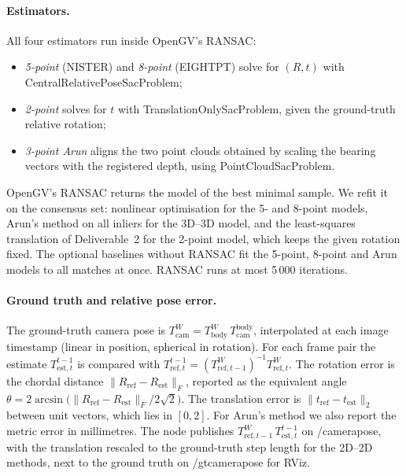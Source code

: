 \documentclass[11pt,a4paper]{article}
\DeclareRobustCommand{\code}[1]{\begingroup\ttfamily\codebreaks#1\endgroup}
\newcommand{\codebreaks}{\renewcommand{\_}{\textunderscore\allowbreak}}
\begin{document}
\paragraph{Estimators.}
All four estimators run inside OpenGV's RANSAC:
\begin{itemize}
  \item \emph{5-point} (\code{NISTER}) and \emph{8-point} (\code{EIGHTPT}) solve
    for $(R, t)$ with\\ \code{CentralRelativePoseSacProblem};
  \item \emph{2-point} solves for $t$ with \code{TranslationOnlySacProblem}, given
    the ground-truth relative rotation;
  \item \emph{3-point Arun} aligns the two point clouds obtained by scaling the
    bearing vectors with the registered depth, using \code{PointCloudSacProblem}.
\end{itemize}
OpenGV's RANSAC returns the model of the best minimal sample. We refit it on the
consensus set: nonlinear optimisation for the 5- and 8-point models, Arun's method on
all inliers for the 3D--3D model, and the least-squares translation of
Deliverable~2 for the 2-point model, which keeps the given rotation fixed. The optional
baselines without RANSAC fit the 5-point, 8-point and Arun models to all matches at
once. RANSAC runs at most 5\,000 iterations.

\paragraph{Ground truth and relative pose error.}
The ground-truth camera pose is $T^W_{\mathrm{cam}} = T^W_{\mathrm{body}}\,
T^{\mathrm{body}}_{\mathrm{cam}}$, interpolated at each image timestamp (linear in
position, spherical in rotation). For each frame pair the estimate
$T^{t-1}_{\mathrm{est},t}$ is compared with
$T^{t-1}_{\mathrm{ref},t} = (T^W_{\mathrm{ref},t-1})^{-1} T^W_{\mathrm{ref},t}$. The
rotation error is the chordal distance $\lVert R_{\mathrm{ref}} - R_{\mathrm{est}}
\rVert_F$, reported as the equivalent angle
$\theta = 2\arcsin\bigl(\lVert R_{\mathrm{ref}} - R_{\mathrm{est}}\rVert_F / 2\sqrt2\bigr)$.
The translation error is $\lVert t_{\mathrm{ref}} - t_{\mathrm{est}}\rVert_2$ between
unit vectors, which lies in $[0, 2]$. For Arun's method we also report the metric error
in millimetres. The node publishes $T^W_{\mathrm{ref},t-1}\,T^{t-1}_{\mathrm{est},t}$
on \code{/camera\_pose}, with the translation rescaled to the ground-truth step length
for the 2D--2D methods, next to the ground truth on \code{/gt\_camera\_pose} for RViz.
\end{document}
